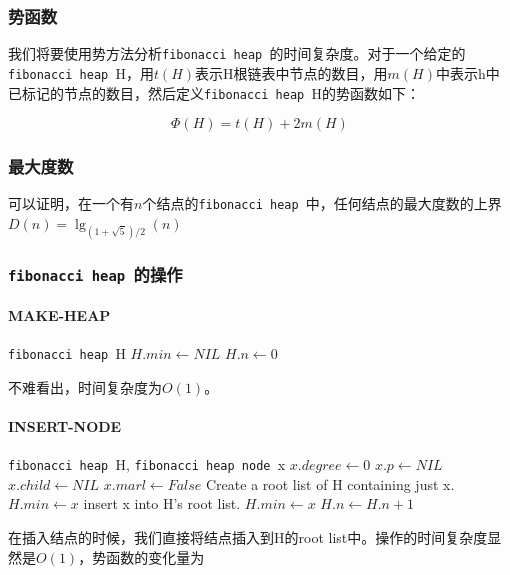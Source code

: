 \documentclass{ctexart}
\newcommand{\fibheap}{\texttt{fibonacci heap }}
\newcommand{\fibnode}{\texttt{fibonacci heap node }}
\begin{document}
\subsubsection{势函数}
我们将要使用势方法分析\fibheap 的时间复杂度。对于一个给定的\fibheap H，用$t(H)$表示H根链表中节点的数目，用$m(H)$中表示h中已标记的节点的数目，然后定义\fibheap H的势函数如下：

\begin{equation*}
    \Phi(H) = t(H) + 2m(H)
\end{equation*}

\subsubsection{最大度数}

可以证明，在一个有$n$个结点的\fibheap 中，任何结点的最大度数的上界$D(n) = \lg_{(1 + \sqrt{5}) / 2}(n)$

\subsubsection{\fibheap 的操作}
\paragraph{MAKE-HEAP}
\begin{algorithm}
    \caption{MAKE-HEAP}
    \begin{algorithmic}[1]
        \Ensure \fibheap H
        \State $H.min \gets NIL$
        \State $H.n \gets 0$
    \end{algorithmic}
\end{algorithm}
不难看出，时间复杂度为$O(1)$。

\paragraph{INSERT-NODE}
\begin{algorithm}
    \caption{INSERT-NODE}
    \begin{algorithmic}[1]
        \Require \fibheap H, \fibnode x
        \State $x.degree \gets 0$
        \State $x.p \gets NIL$
        \State $x.child \gets NIL$
        \State $x.marl \gets False$
            \State Create a root list of H containing just x.
            \State $H.min \gets x$
        \Else
            \State insert x into H's root list.
                \State $H.min \gets x$
            \EndIf
        \EndIf
        \State $H.n \gets H.n + 1$
    \end{algorithmic}
\end{algorithm}
在插入结点的时候，我们直接将结点插入到H的root list中。操作的时间复杂度显然是$O(1)$，势函数的变化量为
\end{document}

